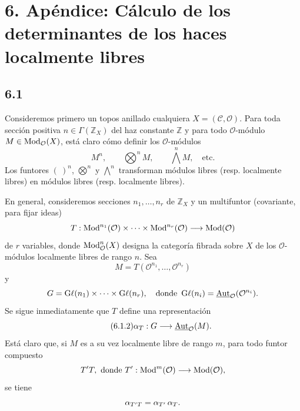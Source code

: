 
\section*{6. Apéndice: Cálculo de los determinantes de los haces localmente libres}

\subsection*{6.1}
Consideremos primero un topos anillado cualquiera
\(X=(\mathcal C,\mathcal O)\). Para toda sección positiva
\(n\in\Gamma(\mathbb Z_X)\) del haz constante \(\mathbb Z\) y para todo
\(\mathcal O\)-módulo \(M\in\operatorname{Mod}_{\mathcal O}(X)\), está claro cómo definir
los \(\mathcal O\)-módulos
\begin{equation}\tag{6.1.1}
 M^n,\qquad \bigotimes^n M,\qquad \bigwedge^n M,\quad\text{etc.}
\end{equation}
Los funtores \((\ )^n\), \(\bigotimes\limits^n\) y
\(\bigwedge\limits^n\) transforman módulos libres (resp. localmente libres)
en módulos libres (resp. localmente libres).

En general, consideremos secciones \(n_1,\ldots,n_r\) de \(\mathbb Z_X\) y
un multifuntor (covariante, para fijar ideas)
\[
 T:\operatorname{Mod}^{n_1}(\mathcal O)\times\cdots\times
 \operatorname{Mod}^{n_r}(\mathcal O)\longrightarrow\operatorname{Mod}(\mathcal O)
\]
de \(r\) variables, donde \(\operatorname{Mod}_{\mathcal O}^{n}(X)\) designa la categoría
fibrada sobre \(X\) de los \(\mathcal O\)-módulos localmente libres de rango
\(n\). Sea
\[
 M=T(\mathcal O^{n_1},\ldots,\mathcal O^{n_r})
\]
y
\[
 G=\operatorname{G\ell}(n_1)\times\cdots\times\operatorname{G\ell}(n_r),
 \quad\text{donde }\operatorname{G\ell}(n_i)=\underline{\operatorname{Aut}}_{\mathcal O}(\mathcal O^{n_i}).
\]
Se sigue inmediatamente que \(T\) define una representación
\begin{equation}\tag{6.1.2}
 \alpha_T:G\longrightarrow\underline{\operatorname{Aut}}_{\mathcal O}(M).
\end{equation}
Está claro que, si \(M\) es a su vez localmente libre de rango \(m\), para
todo funtor compuesto
\[
 T'T,\ \text{donde } T':\operatorname{Mod}^{m}(\mathcal O)\longrightarrow\operatorname{Mod}(\mathcal O),
\]
se tiene
\begin{equation}\sisi{\tag{6.1.3}}{} %
 \alpha_{T'T}=\alpha_{T'}\,\alpha_T.
\end{equation}

